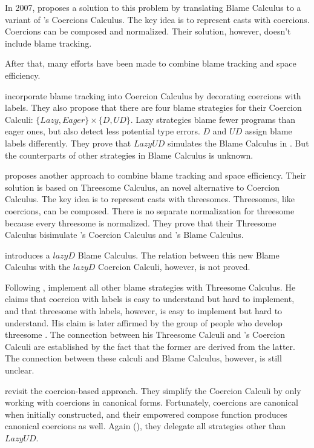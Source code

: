 \documentclass[acmsmall,review,anonymous]{acmart}\settopmatter{printfolios=true,printccs=false,printacmref=false}
\begin{document}
In 2007, \citet{herman2010space} proposes a solution to this problem by 
translating Blame Calculus to a variant of \citet{henglein1994dynamic}'s 
Coercions Calculus. The key idea is to represent casts with coercions. 
Coercions can be composed and normalized. Their solution, however, doesn't 
include blame tracking. 

After that, many efforts have been made to combine blame tracking and 
space efficiency. 

\citet{siek2009exploring} incorporate blame tracking into Coercion Calculus by 
decorating coercions with labels. They also propose that there are four blame 
strategies for their Coercion Calculi:
$ \{Lazy, Eager\} \times \{D, UD\} $. 
Lazy strategies blame fewer programs than eager ones,
but also detect less potential type errors.
$ D $ and $ UD $ assign blame labels differently.
They prove that $ Lazy UD $ simulates the Blame Calculus in 
\cite{wadler2009well}. But the counterparts of other strategies in Blame 
Calculus is unknown.

\citet{siek2010threesomes} proposes another approach to combine blame 
tracking and space efficiency. Their solution is based on Threesome Calculus, 
an novel alternative to Coercion Calculus. The key idea is to represent casts 
with threesomes. Threesomes, like coercions, can be composed. There is no 
separate normalization for threesome because every threesome is normalized. 
They prove that their Threesome Calculus bisimulate 
\citeauthor{siek2009exploring}'s Coercion Calculus and
\citeauthor{wadler2009well}'s Blame Calculus.

\citet{siek2012interpretations} introduces a $ lazy D $  Blame Calculus. The 
relation between this new Blame Calculus with the $ lazy D $ 
Coercion Calculi, however, is not proved.

Following \citet{siek2010threesomes}, \citet{garcia2013calculating} 
implement all other blame strategies with Threesome Calculus. 
He claims that 
coercion with labels is easy to understand but hard to implement, 
and that 
threesome with labels, however, is easy to implement but hard to understand.
His claim is later affirmed by the group of people who develop threesome 
\citet{siek2015blame}. 
The connection 
between his Threesome Calculi and \citeauthor{siek2009exploring}'s Coercion 
Calculi are established by the fact that the former are derived from the latter.
The connection between these calculi and Blame Calculus, however, 
is still unclear.

\citet{siek2015blame} revisit the coercion-based approach. They simplify the 
Coercion Calculi by only working with coercions in canonical forms.
Fortunately, coercions are canonical when initially constructed, and 
their empowered compose function produces canonical coercions as well. Again 
(\citet{siek2010threesomes}), they delegate all strategies other than 
$ Lazy UD $.
\end{document}
